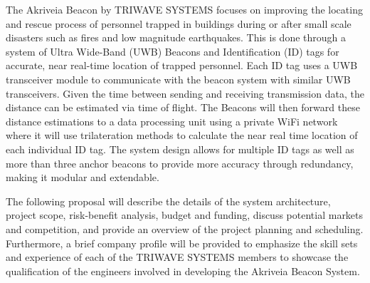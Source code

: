\bigskip
The Akriveia Beacon by TRIWAVE SYSTEMS focuses on improving the locating and rescue process of personnel trapped in buildings during or after small scale disasters such as fires and low magnitude earthquakes. This is done through a system of Ultra Wide-Band (\Gls{UWB}) Beacons and Identification (\Gls{ID}) tags for accurate, near real-time location of trapped personnel. Each ID tag uses a UWB transceiver module to communicate with the beacon system with similar UWB transceivers. Given the time between sending and receiving transmission data, the distance can be estimated via time of flight. The Beacons will then forward these distance estimations to a data processing unit using a private WiFi network where it will use trilateration methods to calculate the near real time location of each individual ID tag. The system design allows for multiple ID tags as well as more than three anchor beacons to provide more accuracy through redundancy, making it modular and extendable.

\bigskip
The following proposal will describe the details of the system architecture, project scope, risk-benefit analysis, budget and funding, discuss potential markets and competition, and provide an overview of the project planning and scheduling. Furthermore, a brief company profile will be provided to emphasize the skill sets and experience of each of the TRIWAVE SYSTEMS members to showcase the qualification of the engineers involved in developing the Akriveia Beacon System. 
















